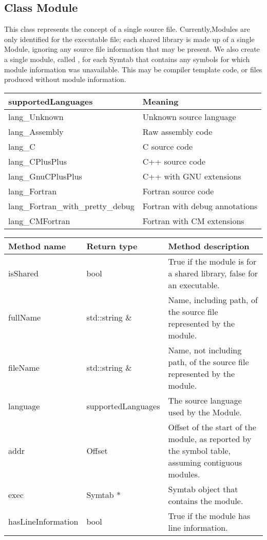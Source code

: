 \subsection{Class Module}\label{Module}
This class represents the concept of a single source file. Currently,Modules are only identified for the executable file; each shared library is made up of a single Module, ignoring any source file information that may be present. We also create a single module, called , for each Symtab that contains any symbols for which module information was unavailable. This may be compiler template code, or files produced without module information. 

\begin{center}
\begin{tabular}{ll}
\toprule
supportedLanguages & Meaning \\
\midrule
lang\_Unknown & Unknown source language \\
lang\_Assembly & Raw assembly code \\
lang\_C & C source code \\
lang\_CPlusPlus & C++ source code \\
lang\_GnuCPlusPlus & C++ with GNU extensions \\
lang\_Fortran & Fortran source code \\
lang\_Fortran\_with\_pretty\_debug & Fortran with debug annotations \\
lang\_CMFortran & Fortran with CM extensions \\
\bottomrule
\end{tabular}
\end{center}

\begin{tabular}{p{1.25in}p{1.25in}p{3in}}
\toprule
Method name & Return type & Method description \\
\midrule
isShared & bool & True if the module is for a shared library, false for an executable. \\
fullName & std::string \& & Name, including path, of the source file represented by the module. \\
fileName & std::string \& & Name, not including path, of the source file represented by the module. \\
language & supportedLanguages & The source language used by the Module. \\
addr & Offset & Offset of the start of the module, as reported by the symbol table, assuming contiguous modules. \\
exec & Symtab * & Symtab object that contains the module. \\
hasLineInformation & bool & True if the module has line information. \\
\bottomrule
\end{tabular}


